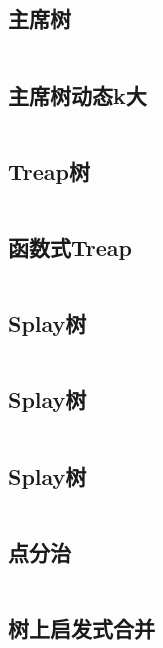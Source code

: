 \inputminted{cpp}{code/2dsegtree2.cc}

\subsection{主席树} 

\inputminted{cpp}{code/chairmantree.cc}

\subsection{主席树动态k大} 

\inputminted{cpp}{code/BITchairmanTree.cc}

\subsection{Treap树} 

\inputminted{cpp}{code/treap.cc}

\subsection{函数式Treap} 

\inputminted{cpp}{code/fhq_treap.cc}

\subsection{Splay树} 

\inputminted{cpp}{code/splay.cc}

\subsection{Splay树} 

\inputminted{cpp}{code/splay2.cc}

\subsection{Splay树} 

\inputminted{cpp}{code/splayTree.cc}

\subsection{点分治} 

\inputminted{cpp}{code/pointDC.cc}

\subsection{树上启发式合并} 

